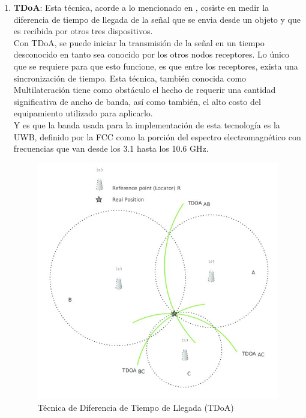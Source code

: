 \begin{itemize}
{\begin{enumerate}
        \item {\textbf{\ac{TDoA}}: Esta técnica, acorde a lo mencionado en \cite{17}, cosiste en medir la diferencia de tiempo de llegada de la señal que se envia desde un objeto y que es recibida por otros tres dispositivos.\\
        
        Con TDoA, se puede iniciar la transmisión de la señal en un tiempo desconocido en tanto sea conocido por los otros nodos receptores. Lo único que se requiere para que esto funcione, es que entre los receptores, exista una sincronización de tiempo. Esta técnica, también conocida como Multilateración tiene como obstáculo el hecho de requerir una cantidad significativa de ancho de banda, así como también, el alto costo del equipamiento utilizado para aplicarlo.\\
        
        Y es que la banda usada para la implementación de esta tecnología es la \ac{UWB}, definido por la \ac{FCC} como la porción del espectro electromagnético con frecuencias que van desde los 3.1 hasta los 10.6 GHz.
        
            \begin{figure}[h!]
                \centering
                \includegraphics[scale=1]{./images/tdoa}
                \caption{Técnica de Diferencia de Tiempo de Llegada (TDoA)}
                \label{fig:TDoA}
            \end{figure}
        
}
\end{enumerate}}
\end{itemize}
